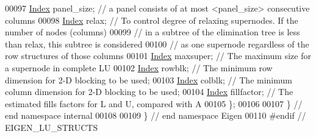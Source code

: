 \begin{DoxyCode}
00097   \hyperlink{namespace_eigen_a62e77e0933482dafde8fe197d9a2cfde}{Index} panel\_size; \textcolor{comment}{// a panel consists of at most <panel\_size> consecutive columns}
00098   \hyperlink{namespace_eigen_a62e77e0933482dafde8fe197d9a2cfde}{Index} relax; \textcolor{comment}{// To control degree of relaxing supernodes. If the number of nodes (columns) }
00099                 \textcolor{comment}{// in a subtree of the elimination tree is less than relax, this subtree is considered }
00100                 \textcolor{comment}{// as one supernode regardless of the row structures of those columns}
00101   \hyperlink{namespace_eigen_a62e77e0933482dafde8fe197d9a2cfde}{Index} maxsuper; \textcolor{comment}{// The maximum size for a supernode in complete LU}
00102   \hyperlink{namespace_eigen_a62e77e0933482dafde8fe197d9a2cfde}{Index} rowblk; \textcolor{comment}{// The minimum row dimension for 2-D blocking to be used;}
00103   \hyperlink{namespace_eigen_a62e77e0933482dafde8fe197d9a2cfde}{Index} colblk; \textcolor{comment}{// The minimum column dimension for 2-D blocking to be used;}
00104   \hyperlink{namespace_eigen_a62e77e0933482dafde8fe197d9a2cfde}{Index} fillfactor; \textcolor{comment}{// The estimated fills factors for L and U, compared with A}
00105 \}; 
00106 
00107 \} \textcolor{comment}{// end namespace internal}
00108 
00109 \} \textcolor{comment}{// end namespace Eigen}
00110 \textcolor{preprocessor}{#endif // EIGEN\_LU\_STRUCTS}
\end{DoxyCode}
